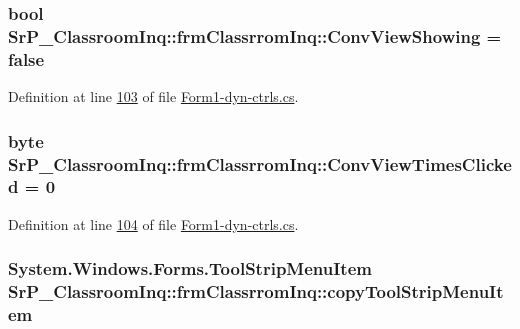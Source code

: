 \hypertarget{class_sr_p___classroom_inq_1_1frm_classrrom_inq_a5b2fbbaa361339e096aa4be3f8e2b2dd}{
\subsubsection[{\-Conv\-View\-Showing}]{\setlength{\rightskip}{0pt plus 5cm}bool {\bf \-Sr\-P\-\_\-\-Classroom\-Inq\-::frm\-Classrrom\-Inq\-::\-Conv\-View\-Showing} = false}}
\label{class_sr_p___classroom_inq_1_1frm_classrrom_inq_a5b2fbbaa361339e096aa4be3f8e2b2dd}


\-Definition at line \hyperlink{_form1-dyn-ctrls_8cs_source_l00103}{103} of file \hyperlink{_form1-dyn-ctrls_8cs_source}{\-Form1-\/dyn-\/ctrls.\-cs}.

\hypertarget{class_sr_p___classroom_inq_1_1frm_classrrom_inq_a8b7285b1ee1626d8ebdc99d4bd6046a8}{
\subsubsection[{\-Conv\-View\-Times\-Clicked}]{\setlength{\rightskip}{0pt plus 5cm}byte {\bf \-Sr\-P\-\_\-\-Classroom\-Inq\-::frm\-Classrrom\-Inq\-::\-Conv\-View\-Times\-Clicked} = 0}}
\label{class_sr_p___classroom_inq_1_1frm_classrrom_inq_a8b7285b1ee1626d8ebdc99d4bd6046a8}


\-Definition at line \hyperlink{_form1-dyn-ctrls_8cs_source_l00104}{104} of file \hyperlink{_form1-dyn-ctrls_8cs_source}{\-Form1-\/dyn-\/ctrls.\-cs}.

\hypertarget{class_sr_p___classroom_inq_1_1frm_classrrom_inq_a945826606f8dc78bfaaa45591619ecfc}{
\subsubsection[{copy\-Tool\-Strip\-Menu\-Item}]{\setlength{\rightskip}{0pt plus 5cm}\-System.\-Windows.\-Forms.\-Tool\-Strip\-Menu\-Item {\bf \-Sr\-P\-\_\-\-Classroom\-Inq\-::frm\-Classrrom\-Inq\-::copy\-Tool\-Strip\-Menu\-Item}}}
\label{class_sr_p___classroom_inq_1_1frm_classrrom_inq_a945826606f8dc78bfaaa45591619ecfc}


